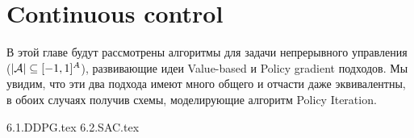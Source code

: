 \documentclass[../main.tex]{subfiles}
\begin{document}
\chapter{Continuous control}\label{continuouscontrolchapter}

В этой главе будут рассмотрены алгоритмы для задачи непрерывного управления ($|\mathcal{A}| \subseteq [-1, 1]^A$), развивающие идеи Value-based и Policy gradient подходов. Мы увидим, что эти два подхода имеют много общего и отчасти даже эквивалентны, в обоих случаях получив схемы, моделирующие алгоритм Policy Iteration.

{6.1.DDPG.tex}
{6.2.SAC.tex}
\end{document}
